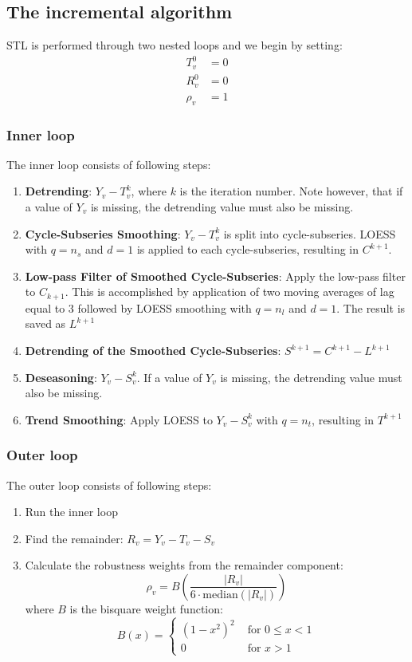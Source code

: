\documentclass[main.tex]{subfiles}
\begin{document}
\subsection{The incremental algorithm}
\label{subsec:the_incremental_algorithm}
STL is performed through two nested loops and we begin by setting:
\begin{align*}
  T_v^{0} &= 0\\
  R_v^{0} &= 0\\
  \rho_v &= 1
\end{align*}
\subsubsection{Inner loop}
The inner loop consists of following steps:
\begin{enumerate}
\item \textbf{Detrending}:
  $Y_v - T_v^k$, where $k$ is the iteration number. Note however,
  that if a value of $Y_v$ is missing, the detrending value must also be missing.
\item \textbf{Cycle-Subseries Smoothing}:
  $Y_v - T_v^k$ is split into cycle-subseries. LOESS with $q=n_s$ and $d=1$ is
  applied to each cycle-subseries, resulting in $C^{k+1}$.
\item \textbf{Low-pass Filter of Smoothed Cycle-Subseries}:
  Apply the low-pass filter to $C_{k+1}$. This is accomplished by application of two
  moving averages of lag equal to 3 followed by LOESS smoothing with $q=n_l$
  and $d=1$.
  The result is saved as $L^{k+1}$
\item \textbf{Detrending of the Smoothed Cycle-Subseries}:
  $S^{k+1} = C^{k+1} - L^{k+1}$
\item \textbf{Deseasoning}:
  $Y_v - S_v^k$. If a value of $Y_v$ is missing, the detrending value must also be missing.
\item \textbf{Trend Smoothing}:
  Apply LOESS to $Y_v - S_v^k$ with $q = n_t$, resulting in $T^{k+1}$
\end{enumerate}

\subsubsection{Outer loop}
The outer loop consists of following steps:
\begin{enumerate}
\item Run the inner loop
\item Find the remainder:
  $R_v = Y_v - T_v - S_v$
\item Calculate the robustness weights from the remainder component:
  \[
  \rho_{v}= B\left( \frac{|R_v|}{6\cdot\text{median}(|R_v|)} \right)
  \]
  where $B$ is the bisquare weight function:
  \[
  B(x) =
  \begin{cases}
    \left(1-x^{2}\right)^{2} & \text{ for } 0 \leqslant x<1 \\
     0                     & \text{ for } x>1
  \end{cases}
\]
\end{enumerate}
\end{document}
